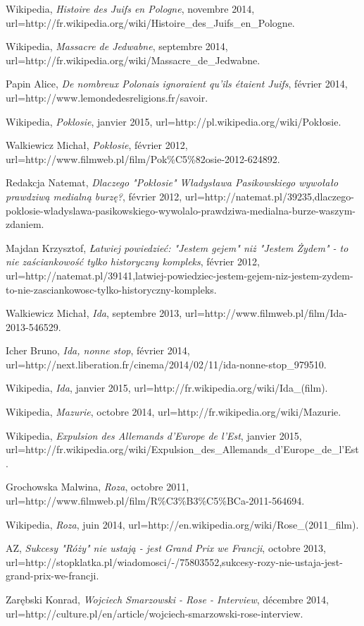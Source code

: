 \documentclass[12pt]{amsart}
\begin{document}
\begin{thebibliography}{100}
	Wikipedia,
	\emph{Histoire des Juifs en Pologne},
	novembre 2014,
	url=http://fr.wikipedia.org/wiki/Histoire\_des\_Juifs\_en\_Pologne.


	Wikipedia,
	\emph{Massacre de Jedwabne},
	septembre 2014,
	url=http://fr.wikipedia.org/wiki/Massacre\_de\_Jedwabne.

	Papin Alice,
	\emph{De nombreux Polonais ignoraient qu'ils étaient Juifs},
	février 2014,
	url=http://www.lemondedesreligions.fr/savoir.

	Wikipedia,
	\emph{Poklosie},
	janvier 2015,
	url=http://pl.wikipedia.org/wiki/Pokłosie.

	Walkiewicz Michał,
	\emph{Pokłosie},
	février 2012,
	url=http://www.filmweb.pl/film/Pok\%C5\%82osie-2012-624892.

	Redakcja Natemat,
	\emph{Dlaczego "Pokłosie" Władysława Pasikowskiego wywołało prawdziwą medialną burzę?},
	février 2012,
	url=http://natemat.pl/39235,dlaczego-poklosie-wladyslawa-pasikowskiego-wywolalo-prawdziwa-medialna-burze-waszym-zdaniem.

	Majdan Krzysztof,
	\emph{Łatwiej powiedzieć: "Jestem gejem" niż "Jestem Żydem" - to nie zaściankowość tylko historyczny kompleks},
	février 2012,
	url=http://natemat.pl/39141,latwiej-powiedziec-jestem-gejem-niz-jestem-zydem-to-nie-zasciankowosc-tylko-historyczny-kompleks.

	Walkiewicz Michał,
	\emph{Ida},
	septembre 2013,
	url=http://www.filmweb.pl/film/Ida-2013-546529.

	Icher Bruno,
	\emph{Ida, nonne stop},
	février 2014,
	url=http://next.liberation.fr/cinema/2014/02/11/ida-nonne-stop\_979510.

	Wikipedia,
	\emph{Ida},
	janvier 2015,
	url=http://fr.wikipedia.org/wiki/Ida\_(film).

	Wikipedia,
	\emph{Mazurie},
	octobre 2014,
	url=http://fr.wikipedia.org/wiki/Mazurie.

	Wikipedia,
	\emph{Expulsion des Allemands d'Europe de l'Est},
	janvier 2015,
	url=http://fr.wikipedia.org/wiki/Expulsion\_des\_Allemands\_d'Europe\_de\_l'Est.

	Grochowska Malwina,
	\emph{Roza},
	octobre 2011,
	url=http://www.filmweb.pl/film/R\%C3\%B3\%C5\%BCa-2011-564694.

	Wikipedia,
	\emph{Roza},
	juin 2014,
	url=http://en.wikipedia.org/wiki/Rose\_(2011\_film).

	AZ,
	\emph{Sukcesy "Róży" nie ustają - jest Grand Prix we Francji},
	octobre 2013,
	url=http://stopklatka.pl/wiadomosci/-/75803552,sukcesy-rozy-nie-ustaja-jest-grand-prix-we-francji.

	Zarębski Konrad,
	\emph{Wojciech Smarzowski - Rose - Interview},
	décembre 2014,
	url=http://culture.pl/en/article/wojciech-smarzowski-rose-interview.

\end{thebibliography}
\end{document}
